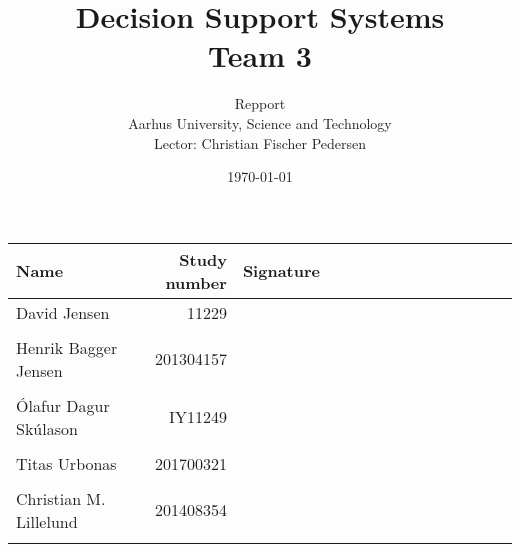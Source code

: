 \documentclass[a4paper,11pt,twoside,openright]{memoir}
\title{Decision Support Systems \\ Team 3}
\author{Repport \\ Aarhus University, Science and Technology \\ Lector: Christian Fischer Pedersen}
\date{\today}
\begin{document}
\fancyhf{} %
\frontmatter
\maketitle
\vfill


\begin{table} [h]
	\centering
	\begin{tabular}{|l|r|l|}
	\hline 
	\textbf{Name} 				& \textbf{Study number} & \textbf{Signature~~~~~~~~~~~~~~~~~~~~} 	\\ \hline
	David Jensen 				& 11229 	& \\ && 												\\ \hline
	Henrik Bagger Jensen 		& 201304157 & \\ && 												\\ \hline
	Ólafur Dagur Skúlason 		& IY11249	& \\ && 												\\ \hline
	Titas Urbonas 				& 201700321 & \\ && 												\\ \hline
	Christian M. Lillelund 		& 201408354 & \\ && 												\\ \hline

	\end{tabular}
\end{table}

\clearpage
\pagestyle{plain}

\tableofcontents

\vfill

\mainmatter
\pagestyle{fancy}
\fancyhf{} %
\fancyhead[CE,CO]{\nouppercase{\leftmark}}
\fancyfoot[CO,CE]{\nouppercase{\rightmark}}
\fancyfoot[LE,RO]{\thepage}

								    \cleartorightpage
										\cleartorightpage
		\cleartorightpage
							\cleartorightpage
							\cleartorightpage
							\cleartorightpage
						\cleartorightpage
								        \cleartorightpage
										\cleartorightpage
									\cleartorightpage
										\cleartorightpage

\end{document}
